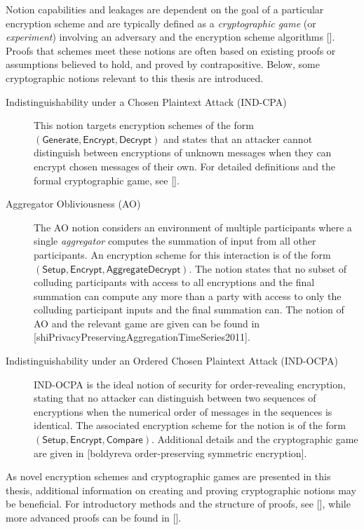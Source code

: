 Notion capabilities and leakages are dependent on the goal of a particular encryption scheme and are typically defined as a \textit{cryptographic game} (or \textit{experiment}) involving an adversary and the encryption scheme algorithms []. Proofs that schemes meet these notions are often based on existing proofs or assumptions believed to hold, and proved by contrapositive. Below, some cryptographic notions relevant to this thesis are introduced.
\begin{description}
    \item[Indistinguishability under a Chosen Plaintext Attack (IND-CPA)] This notion targets encryption schemes of the form $(\mathsf{Generate},\mathsf{Encrypt},\mathsf{Decrypt})$ and states that an attacker cannot distinguish between encryptions of unknown messages when they can encrypt chosen messages of their own. For detailed definitions and the formal cryptographic game, see [].
    \item[Aggregator Obliviousness (AO)] The AO notion considers an environment of multiple participants where a single \textit{aggregator} computes the summation of input from all other participants. An encryption scheme for this interaction is of the form $(\mathsf{Setup},\mathsf{Encrypt},\mathsf{AggregateDecrypt})$. The notion states that no subset of colluding participants with access to all encryptions and the final summation can compute any more than a party with access to only the colluding participant inputs and the final summation can. The notion of AO and the relevant game are given can be found in [shiPrivacyPreservingAggregationTimeSeries2011].
    \item[Indistinguishability under an Ordered Chosen Plaintext Attack (IND-OCPA)] IND-OCPA is the ideal notion of security for order-revealing encryption, stating that no attacker can distinguish between two sequences of encryptions when the numerical order of messages in the sequences is identical. The associated encryption scheme for the notion is of the form $(\mathsf{Setup},\mathsf{Encrypt},\mathsf{Compare})$. Additional details and the cryptographic game are given in [boldyreva order-preserving symmetric encryption].
\end{description}
As novel encryption schemes and cryptographic games are presented in this thesis, additional information on creating and proving cryptographic notions may be beneficial. For introductory methods and the structure of proofs, see [], while more advanced proofs can be found in [].

% 
% 

